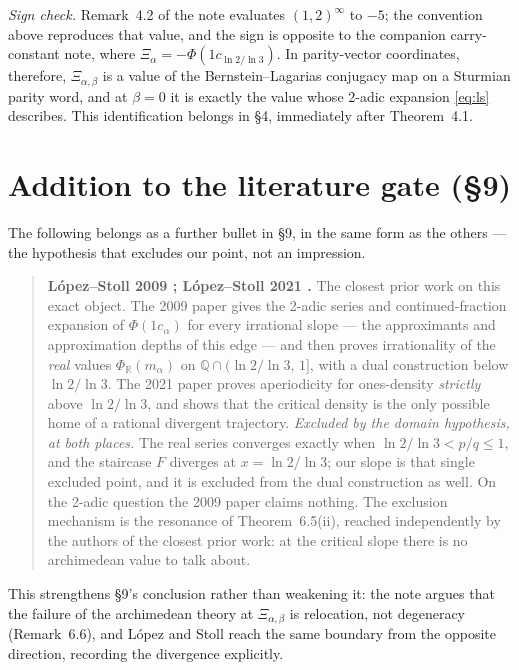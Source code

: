\documentclass[10pt]{article}
\newcommand{\Xab}{\Xi_{\alpha,\beta}}
\begin{document}
\noindent\emph{Sign check.} Remark~4.2 of the note evaluates $(1,2)^\infty$ to $-5$; the
convention above reproduces that value, and the sign is opposite to the companion carry-constant
note, where $\Xi_\alpha=-\Phi(1c_{\ln 2/\ln 3})$. In parity-vector coordinates, therefore, $\Xab$
is a value of the Bernstein--Lagarias conjugacy map
\cite{bernstein1994noniterative,bernstein1996conjugacy} on a Sturmian parity word, and at
$\beta=0$ it is exactly the value whose 2-adic expansion \eqref{eq:ls} describes. This
identification belongs in \S4, immediately after Theorem~4.1.

\section{Addition to the literature gate (\S9)}

The following belongs as a further bullet in \S9, in the same form as the others --- the
hypothesis that excludes our point, not an impression.

\begin{quote}
\textbf{L\'opez--Stoll 2009 \cite{lopez2009conjugacy}; L\'opez--Stoll 2021
\cite{lopez2021periodicity}.} The closest prior work on this exact object. The 2009 paper gives
the 2-adic series and continued-fraction expansion of $\Phi(1c_\alpha)$ for every irrational slope
--- the approximants and approximation depths of this edge --- and then proves irrationality of
the \emph{real} values $\Phi_{\mathbb{R}}(m_\alpha)$ on $\mathbb{Q}\cap(\ln2/\ln3,\,1]$, with a
dual construction below $\ln2/\ln3$. The 2021 paper proves aperiodicity for ones-density
\emph{strictly} above $\ln2/\ln3$, and shows that the critical density is the only possible home
of a rational divergent trajectory. \emph{Excluded by the domain hypothesis, at both places.} The
real series converges exactly when $\ln2/\ln3 < p/q \le 1$, and the staircase $F$ diverges at
$x=\ln2/\ln3$; our slope is that single excluded point, and it is excluded from the dual
construction as well. On the 2-adic question the 2009 paper claims nothing. The exclusion
mechanism is the resonance of Theorem~6.5(ii), reached independently by the authors of the closest
prior work: at the critical slope there is no archimedean value to talk about.
\end{quote}

\noindent This strengthens \S9's conclusion rather than weakening it: the note argues that the
failure of the archimedean theory at $\Xab$ is relocation, not degeneracy (Remark~6.6), and
L\'opez and Stoll reach the same boundary from the opposite direction, recording the divergence
explicitly.
\end{document}
